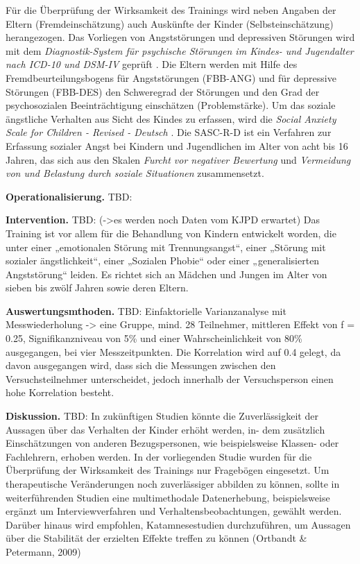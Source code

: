 Für die Überprüfung der Wirksamkeit des Trainings wird neben Angaben der Eltern (Fremdeinschätzung) auch Auskünfte der Kinder (Selbsteinschätzung) herangezogen. Das Vorliegen von Angststörungen und depressiven Störungen wird mit dem \textit{Diagnostik-System für psychische Störungen im Kindes- und Jugendalter nach ICD-10 und DSM-IV} geprüft \cite<DISYPS-KJ>{Doepfner:2003}. Die Eltern werden mit Hilfe des Fremdbeurteilungsbogens für Angststörungen (FBB-ANG) und für depressive Störungen (FBB-DES) den Schweregrad der Störungen und den Grad der psychosozialen Beeinträchtigung einschätzen (Problemstärke). Um das soziale ängstliche Verhalten aus Sicht des Kindes zu erfassen, wird die \textit{Social Anxiety Scale for Children - Revised - Deutsch} \cite<SASC-R-D>{Melfsen:1999}. Die SASC-R-D ist ein Verfahren zur Erfassung sozialer Angst bei Kindern und Jugendlichen im Alter von acht bis 16 Jahren, das sich aus den Skalen \textit{Furcht vor negativer Bewertung} und \textit{Vermeidung von und Belastung durch soziale Situationen} zusammensetzt.

\textbf{Operationalisierung.} TBD: 

\textbf{Intervention.} TBD: (->es werden noch Daten vom KJPD erwartet) Das Training ist vor allem für die Behandlung von Kindern entwickelt worden, die unter einer „emotionalen Störung mit Trennungsangst“, einer „Störung mit sozialer ängstlichkeit“, einer „Sozialen Phobie“ oder einer „generalisierten Angststörung“ leiden. Es richtet sich an Mädchen und Jungen im Alter von sieben bis zwölf Jahren sowie deren Eltern.

\textbf{Auswertungsmthoden.} TBD: Einfaktorielle Varianzanalyse mit Messwiederholung -> eine Gruppe, mind. 28 Teilnehmer, mittleren Effekt von f = 0.25, Signifikanzniveau von 5\% und einer Wahrscheinlichkeit von 80\% ausgegangen, bei vier Messzeitpunkten. Die Korrelation wird auf 0.4 gelegt, da davon ausgegangen wird, dass sich die Messungen zwischen den Versuchsteilnehmer unterscheidet, jedoch innerhalb der Versuchsperson einen hohe Korrelation besteht.

\textbf{Diskussion.} TBD: In zukünftigen Studien könnte die Zuverlässigkeit der Aussagen über das Verhalten der Kinder erhöht werden, in- dem zusätzlich Einschätzungen von anderen Bezugspersonen, wie beispielsweise Klassen- oder Fachlehrern, erhoben werden. In der vorliegenden Studie wurden für die Überprüfung der Wirksamkeit des Trainings nur Fragebögen eingesetzt. Um therapeutische Veränderungen noch zuverlässiger abbilden zu können, sollte in weiterführenden Studien eine multimethodale Datenerhebung, beispielsweise ergänzt um Interviewverfahren und Verhaltensbeobachtungen, gewählt werden. Darüber hinaus wird empfohlen, Katamnesestudien durchzuführen, um Aussagen über die Stabilität der erzielten Effekte treffen zu können (Ortbandt \& Petermann, 2009)